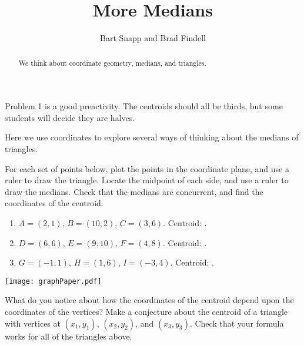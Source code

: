 \documentclass[nooutcomes]{ximera}
\title{More Medians}
\author{Bart Snapp and Brad Findell}
\begin{document}
\begin{abstract}
  We think about coordinate geometry, medians, and triangles.
\end{abstract}
\maketitle

\begin{teachingnote}
Problem 1 is a good preactivity.  The centroids should all be thirds, but some students will decide they are halves.  
\end{teachingnote}
Here we use coordinates to explore several ways of thinking about the medians of triangles.  

\begin{problem}
For each set of points below, plot the points in the coordinate plane, and use a ruler to draw the triangle.  Locate the midpoint of each side, and use a ruler to draw the medians.   Check that the medians are concurrent, and find the coordinates of the centroid.  
\begin{enumerate}
\setlength{\itemsep}{4pt}
\item $A=(2, 1)$, $B=(10, 2)$, $C=(3, 6)$.  Centroid: \underline{\hspace{1.5cm}}. 
\item $D=(6, 6)$, $E=(9, 10)$, $F=(4, 8)$.  Centroid: \underline{\hspace{1.5cm}}. 
\item $G=(-1, 1)$, $H=(1, 6)$, $I=(-3, 4)$.  Centroid: \underline{\hspace{1.5cm}}. 
\end{enumerate}

\begin{image}
\texttt{[image: graphPaper.pdf]}
\end{image}

\end{problem}

\begin{problem}
What do you notice about how the coordinates of the centroid depend upon the coordinates of the vertices?  Make a conjecture about the centroid of a triangle with vertices at $(x_1, y_1)$, $(x_2, y_2)$, and $(x_3, y_3)$.  Check that your formula works for all of the triangles above.
\end{problem}
\end{document}
